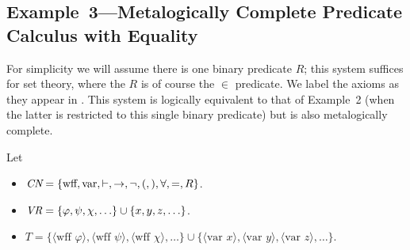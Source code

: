 \subsection{Example~3---Metalogically Complete Predicate
Calculus with
Equality}

For simplicity we will assume there is one binary predicate $R$;
this system suffices for set theory, where the $R$ is of course the $\in$
predicate.  We label the axioms as they appear in \cite{Megill}.  This
system is logically equivalent to that of Example~2 (when the latter is
restricted to this single binary predicate) but is also metalogically
complete.

Let
\begin{itemize}
  \item[] $\mbox{\em CN}=\{\mbox{wff}, \mbox{var}, \vdash, \to, \lnot, (,),\forall,=,R\}$.
  \item[] $\mbox{\em VR}=\{\varphi,\psi,\chi,\ldots\}\cup\{x,y,z,\ldots\}$.
  \item[] $T = \{\langle \mbox{wff\ } \varphi\rangle,
             \langle \mbox{wff\ } \psi\rangle,
             \langle \mbox{wff\ } \chi\rangle,\ldots\}\cup
       \{\langle \mbox{var\ } x\rangle, \langle \mbox{var\ } y\rangle, \langle
       \mbox{var\ }z\rangle,\ldots\}$.


\end{itemize}
